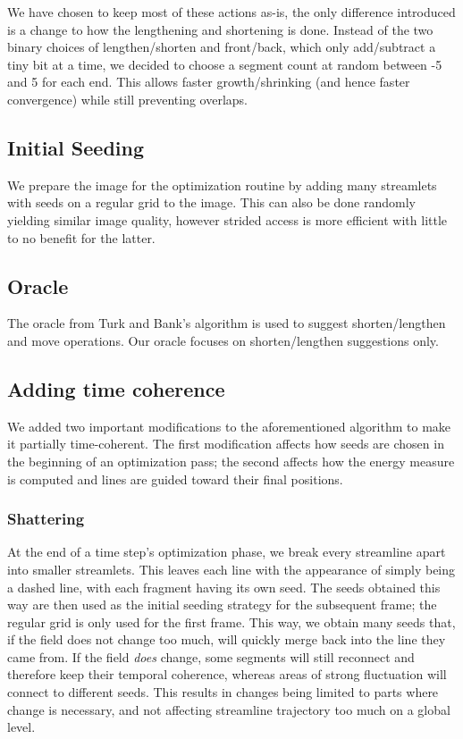 We have chosen to keep most of these actions as-is, the only difference introduced is
a change to how the lengthening and shortening is done. 
Instead of the two binary choices of lengthen/shorten and front/back, which only add/subtract a tiny bit at a time,
we decided to choose a segment count at random between -5 and 5 for each end.
This allows faster growth/shrinking (and hence faster convergence) while still preventing overlaps.

\subsection{Initial Seeding}
We prepare the image for the optimization routine by adding many streamlets with seeds on a regular grid to the image.
This can also be done randomly yielding similar image quality,
however strided access is more efficient with little to no benefit for the latter.

\subsection{Oracle}
The oracle from Turk and Bank's algorithm is used to suggest shorten/lengthen and move operations.
Our oracle focuses on shorten/lengthen suggestions only.

\subsection{Adding time coherence}
We added two important modifications to the aforementioned algorithm to make it partially time-coherent.
The first modification affects how seeds are chosen in the beginning of an optimization pass; the second affects
how the energy measure is computed and lines are guided toward their final positions.

\subsubsection*{Shattering}
At the end of a time step's optimization phase, we break every streamline apart into smaller streamlets.
This leaves each line with the appearance of simply being a dashed line, with each fragment having its own seed.
The seeds obtained this way are then used as the initial seeding strategy for the subsequent frame; the regular grid is only used for the first frame.
This way, we obtain many seeds that, if the field does not change too much, will quickly merge back into the line they came from.
If the field \textit{does} change, some segments will still reconnect and therefore keep their temporal coherence,
whereas areas of strong fluctuation will connect to different seeds.
This results in changes being limited to parts where change is necessary, and not affecting streamline trajectory too much on a global level.

